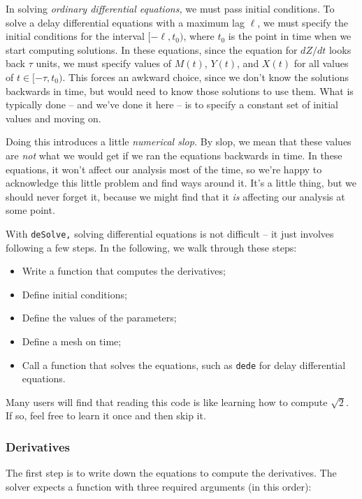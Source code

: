 \documentclass[
]{book}
\begin{document}
In solving \emph{ordinary differential equations,} we must pass initial conditions. To solve a delay differential equations with a maximum lag \(\ell\), we must specify the initial conditions for the interval \([-\ell, t_0)\), where \(t_0\) is the point in time when we start computing solutions.
In these equations, since the equation for \(dZ/dt\) looks back \(\tau\) units, we must specify values of \(M(t)\), \(Y(t)\), and \(X(t)\) for all values of \(t \in [-\tau, t_0)\). This forces an awkward choice, since we don't know the solutions backwards in time, but would need to know those solutions to use them. What is typically done -- and we've done it here -- is to specify a constant set of initial values and moving on.

Doing this introduces a little \emph{numerical slop.} By slop, we mean that these values are \emph{not} what we would get if we ran the equations backwards in time. In these equations, it won't affect our analysis most of the time, so we're happy to acknowledge this little problem and find ways around it. It's a little thing, but we should never forget it, because we might find that it \emph{is} affecting our analysis at some point.

With \texttt{deSolve,} solving differential equations is not difficult -- it just involves following a few steps. In the following, we walk through these steps:

\begin{itemize}
\item
  Write a function that computes the derivatives;
\item
  Define initial conditions;
\item
  Define the values of the parameters;
\item
  Define a mesh on time;
\item
  Call a function that solves the equations, such as \texttt{dede} for delay differential equations.
\end{itemize}

Many users will find that reading this code is like learning how to compute \(\sqrt{2}\). If so, feel free to learn it once and then skip it.

\subsubsection{Derivatives}\label{derivatives}

The first step is to write down the equations to compute the derivatives. The solver expects a function with three required arguments (in this order):
\end{document}
